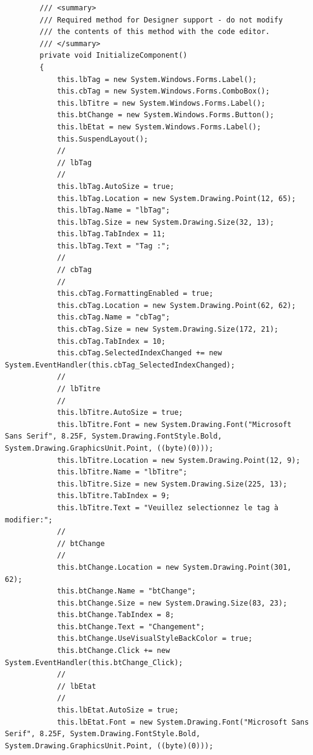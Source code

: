 \documentclass[main.tex]{subfiles}
\begin{document}
\begin{lstlisting}
        /// <summary>
        /// Required method for Designer support - do not modify
        /// the contents of this method with the code editor.
        /// </summary>
        private void InitializeComponent()
        {
            this.lbTag = new System.Windows.Forms.Label();
            this.cbTag = new System.Windows.Forms.ComboBox();
            this.lbTitre = new System.Windows.Forms.Label();
            this.btChange = new System.Windows.Forms.Button();
            this.lbEtat = new System.Windows.Forms.Label();
            this.SuspendLayout();
            // 
            // lbTag
            // 
            this.lbTag.AutoSize = true;
            this.lbTag.Location = new System.Drawing.Point(12, 65);
            this.lbTag.Name = "lbTag";
            this.lbTag.Size = new System.Drawing.Size(32, 13);
            this.lbTag.TabIndex = 11;
            this.lbTag.Text = "Tag :";
            // 
            // cbTag
            // 
            this.cbTag.FormattingEnabled = true;
            this.cbTag.Location = new System.Drawing.Point(62, 62);
            this.cbTag.Name = "cbTag";
            this.cbTag.Size = new System.Drawing.Size(172, 21);
            this.cbTag.TabIndex = 10;
            this.cbTag.SelectedIndexChanged += new System.EventHandler(this.cbTag_SelectedIndexChanged);
            // 
            // lbTitre
            // 
            this.lbTitre.AutoSize = true;
            this.lbTitre.Font = new System.Drawing.Font("Microsoft Sans Serif", 8.25F, System.Drawing.FontStyle.Bold, System.Drawing.GraphicsUnit.Point, ((byte)(0)));
            this.lbTitre.Location = new System.Drawing.Point(12, 9);
            this.lbTitre.Name = "lbTitre";
            this.lbTitre.Size = new System.Drawing.Size(225, 13);
            this.lbTitre.TabIndex = 9;
            this.lbTitre.Text = "Veuillez selectionnez le tag à modifier:";
            // 
            // btChange
            // 
            this.btChange.Location = new System.Drawing.Point(301, 62);
            this.btChange.Name = "btChange";
            this.btChange.Size = new System.Drawing.Size(83, 23);
            this.btChange.TabIndex = 8;
            this.btChange.Text = "Changement";
            this.btChange.UseVisualStyleBackColor = true;
            this.btChange.Click += new System.EventHandler(this.btChange_Click);
            // 
            // lbEtat
            // 
            this.lbEtat.AutoSize = true;
            this.lbEtat.Font = new System.Drawing.Font("Microsoft Sans Serif", 8.25F, System.Drawing.FontStyle.Bold, System.Drawing.GraphicsUnit.Point, ((byte)(0)));

\end{lstlisting}
\end{document}
